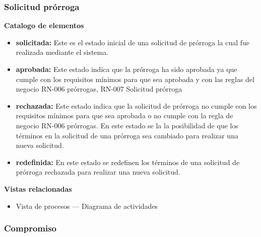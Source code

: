 \documentclass[12pt,oneside,letterpaper]{report}
\begin{document}
\subsubsection{Solicitud prórroga}


\textbf{Catalogo de elementos}

\begin{itemize}
 \item \textbf{solicitada:} Este es el estado inicial de una solicitud de prórroga la cual fue realizada mediante el sistema.
 \item \textbf{aprobada:} Este estado indica que la prórroga ha sido aprobada ya que cumple con los requisitos mínimos para que sea aprobada y con las reglas del negocio RN-006 prórrogas, RN-007 Solicitud  prórroga
 \item \textbf{rechazada:} Este estado indica que la solicitud de prórroga no cumple con los requisitos mínimos para que sea aprobada o no cumple con la regla de negocio RN-006 prórrogas. En este estado se la la posibilidad de que los términos en la solicitud de una prórroga sea cambiado para realizar una nueva solicitud.
 \item \textbf{redefinida:} En este estado se redefinen los términos de una solicitud de prórroga rechazada para realizar una nueva solicitud.
\end{itemize}


\textbf{Vistas relacionadas}
\begin{itemize}
 \item Vista de procesos --- Diagrama de actividades
\end{itemize}


\subsubsection{Compromiso}

\end{document}
